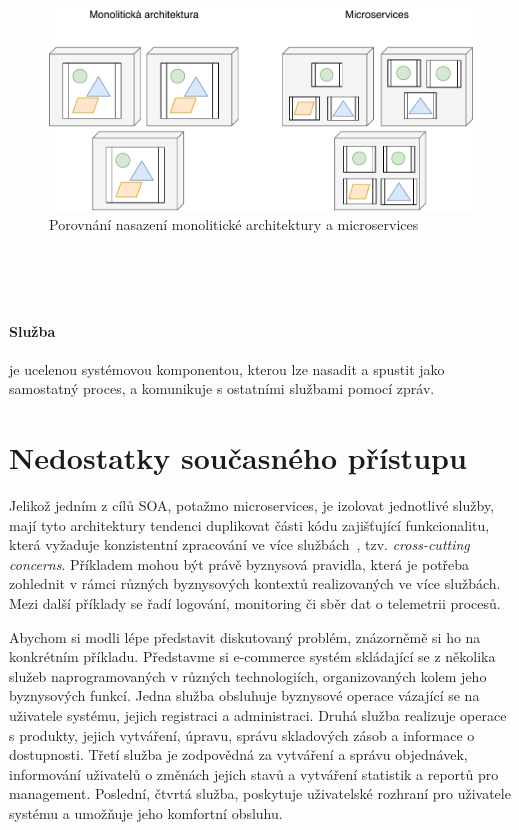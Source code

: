 
\begin{figure}
    \centering
    \includegraphics[keepaspectratio=true, width=0.8\linewidth]{figures/microservices-deployment.pdf}
    \caption{Porovnání nasazení monolitické architektury a microservices}
    \label{fig:microservices-deployment}
\end{figure}

~\cite{perrey2003service}
~\cite{cerny2017disambiguation}
~\cite{sprott2004understanding}



~\cite{nginx2015fourtier}


\paragraph{Služba} je ucelenou systémovou komponentou,
kterou lze nasadit a spustit jako samostatný proces, a
komunikuje s ostatními službami pomocí zpráv.

\section{Nedostatky současného přístupu}

Jelikož jedním z cílů SOA, potažmo microservices, je izolovat
jednotlivé služby, mají tyto architektury tendenci duplikovat části kódu
zajišťující funkcionalitu, která vyžaduje konzistentní zpracování ve více
službách~\cite{cerny2017disambiguation}, tzv. \textit{cross-cutting concerns}.
Příkladem mohou být právě byznysová pravidla, která je potřeba
zohlednit v rámci různých byznysových kontextů realizovaných ve více službách.
Mezi další příklady se řadí logování, monitoring či sběr dat
o telemetrii procesů.

Abychom si modli lépe představit diskutovaný problém, znázorněmě
si ho na konkrétním příkladu. Představme si e-commerce systém
skládající se z několika služeb naprogramovaných v různých technologiích,
organizovaných kolem jeho byznysových funkcí.
Jedna služba obsluhuje byznysové operace vázající
se na uživatele systému, jejich registraci a administraci. Druhá
služba realizuje operace s produkty, jejich vytváření, úpravu,
správu skladových zásob a informace o dostupnosti. Třetí služba je
zodpovědná za vytváření a správu objednávek, informování uživatelů
o změnách jejich stavů a vytváření statistik a reportů pro management.
Poslední, čtvrtá služba, poskytuje uživatelské rozhraní pro uživatele
systému a umožňuje jeho komfortní obsluhu.

